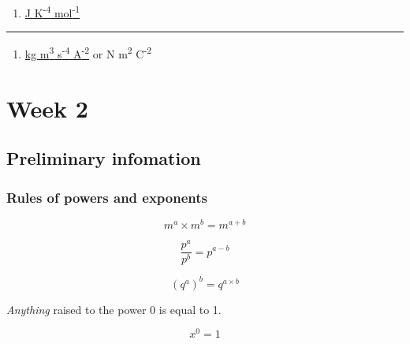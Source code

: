 \documentclass[
]{book}
\providecommand{\tightlist}{%
  \setlength{\itemsep}{0pt}\setlength{\parskip}{0pt}}
\begin{document}
\begin{enumerate}
\def\labelenumi{\arabic{enumi}.}
\setcounter{enumi}{2}
\tightlist
\item
  \href{https://www.youtube.com/embed/SECV4uuki3s}{J K\textsuperscript{-4} mol\textsuperscript{-1}}
\end{enumerate}

\begin{center}\rule{0.5\linewidth}{0.5pt}\end{center}

\begin{enumerate}
\def\labelenumi{\arabic{enumi}.}
\setcounter{enumi}{3}
\tightlist
\item
  \href{https://www.youtube.com/embed/DsxrbDyCjTU}{kg m\textsuperscript{3} s\textsuperscript{-4} A\textsuperscript{-2}} or N m\textsuperscript{2} C\textsuperscript{-2}
\end{enumerate}

\hypertarget{ch:Workshop2}{%
\chapter{Week 2}\label{ch:Workshop2}}

\hypertarget{sec:Prelim2}{%
\section{Preliminary infomation}\label{sec:Prelim2}}

\hypertarget{sec:rulespowers}{%
\subsection{Rules of powers and exponents}\label{sec:rulespowers}}

\begin{equation}
m^a \times m^b = m^{a+b}
\label{eq:combpowermult}
\end{equation}

\begin{equation}
\frac{p^a}{p^b} = p^{a - b}
\label{eq:combpowerdiv}
\end{equation}

\begin{equation}
\left(q^a\right)^b =  q^{a\times b}
\label{eq:combpowerraise}
\end{equation}

\emph{Anything} raised to the power 0 is equal to 1.

\begin{equation*}
x^0=1
\end{equation*}
\end{document}
